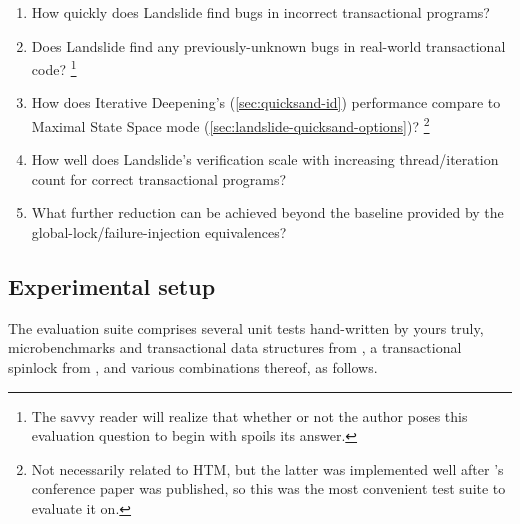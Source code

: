 \begin{enumerate}
	\item How quickly does Landslide find bugs in incorrect transactional programs? %
	\item Does Landslide find any previously-unknown bugs in real-world transactional code?%
		\footnote{The savvy reader will realize that whether or not the author poses this evaluation question to begin with spoils its answer.}
	\item How does Iterative Deepening's (\cref{sec:quicksand-id})
		performance compare to Maximal State Space mode (\cref{sec:landslide-quicksand-options})?%
		\footnote{Not necessarily related to HTM,
		but the latter was implemented well after 's conference paper was published,
		so this was the most convenient test suite to evaluate it on.}
	\item How well does Landslide's verification scale
		with increasing thread/iteration count for correct transactional programs?
	\item What further reduction can be achieved beyond the baseline provided by
		the global-lock/failure-injection equivalences?
\end{enumerate}

\subsection{Experimental setup}
\label{sec:tm-eval-exp-setup}

The evaluation suite comprises several unit tests hand-written by yours truly,
microbenchmarks and transactional data structures from \cite{tm-benchmark-cmu},
a transactional spinlock from \cite{spinlock-rtm-github},
and various combinations thereof,
as follows.


